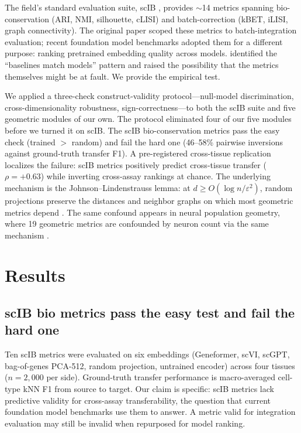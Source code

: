 \documentclass[11pt]{article}
\begin{document}
The field's standard evaluation suite, scIB \citep{luecken2022scib}, provides $\sim$14 metrics spanning bio-conservation (ARI, NMI, silhouette, cLISI) and batch-correction (kBET, iLISI, graph connectivity). The original paper scoped these metrics to batch-integration evaluation; recent foundation model benchmarks \citep{wu2025scfm, vcbench2026, unifiedscfm2026, cellxgeneintegration2026} adopted them for a different purpose: ranking pretrained embedding quality across models. \citet{wu2025scfm} identified the ``baselines match models'' pattern and raised the possibility that the metrics themselves might be at fault. We provide the empirical test.

We applied a three-check construct-validity protocol---null-model discrimination, cross-dimensionality robustness, sign-correctness---to both the scIB suite and five geometric modules of our own. The protocol eliminated four of our five modules before we turned it on scIB. The scIB bio-conservation metrics pass the easy check (trained $>$ random) and fail the hard one (46--58\% pairwise inversions against ground-truth transfer F1). A pre-registered cross-tissue replication localizes the failure: scIB metrics positively predict cross-tissue transfer ($\rho = +0.63$) while inverting cross-assay rankings at chance. The underlying mechanism is the Johnson--Lindenstrauss lemma: at $d \geq O(\log n / \varepsilon^2)$, random projections preserve the distances and neighbor graphs on which most geometric metrics depend \citep{johnsonlindenstrauss1984}. The same confound appears in neural population geometry, where 19 geometric metrics are confounded by neuron count via the same mechanism \citep{tower2026bracket}.


\section{Results}

\subsection{scIB bio metrics pass the easy test and fail the hard one}
\label{sec:scib}

Ten scIB metrics were evaluated on six embeddings (Geneformer, scVI, scGPT, bag-of-genes PCA-512, random projection, untrained encoder) across four tissues ($n = 2{,}000$ per side). Ground-truth transfer performance is macro-averaged cell-type kNN F1 from source to target. Our claim is specific: scIB metrics lack predictive validity for cross-assay transferability, the question that current foundation model benchmarks use them to answer. A metric valid for integration evaluation may still be invalid when repurposed for model ranking.
\end{document}
